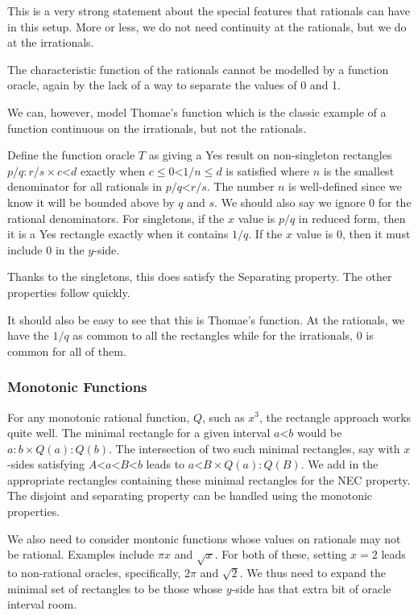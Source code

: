 \documentclass[12pt]{article}
\theoremstyle{remark}
\newcommand{\lt}{\mathord{<}}
\begin{document}
This is a very strong statement about the special features that rationals can have in this setup. More or less, we do not need continuity at the rationals, but we do at the irrationals. 

The characteristic function of the rationals cannot be modelled by a function oracle, again by the lack of a way to separate the values of 0 and 1. 

We can, however, model Thomae's function which is the classic example of a function continuous on the irrationals, but not the rationals. 

Define the function oracle $T$ as giving a Yes result on non-singleton rectangles $p/q : r/s \times c\lt d$ exactly when $c \leq 0 \lt 1/n \leq d$ is satisfied where $n$ is the smallest denominator for all rationals in $p/q \lt r/s$. The number $n$ is well-defined since we know it will be bounded above by $q$ and $s$.  We should also say we ignore $0$ for the rational denominators. For singletons, if the $x$ value is $p/q$ in reduced form, then it is a Yes rectangle exactly when it contains $1/q$. If the $x$ value is $0$, then it must include $0$ in the $y$-side.

Thanks to the singletons, this does satisfy the Separating property. The other properties follow quickly. 

It should also be easy to see that this is Thomae's function. At the rationals, we have the $1/q$ as common to all the rectangles while for the irrationals, $0$ is common for all of them. 

\subsubsection{Monotonic Functions}

For any monotonic rational function, $Q$, such as $x^3$, the rectangle approach works quite well. The minimal rectangle for a given interval $a \lt b$ would be $a:b \times Q(a):Q(b)$. The intersection of two such minimal rectangles, say with $x$-sides satisfying $A \lt a \lt B \lt b$ leads to $a \lt B  \times  Q(a):Q(B) $. We add in the appropriate rectangles containing these minimal rectangles for the NEC property. The disjoint and separating property can be handled using the monotonic properties. 

We also need to consider montonic functions whose values on rationals may not be rational. Examples include $\pi x$ and $\sqrt{x}$. For both of these, setting $x=2$ leads to non-rational oracles, specifically, $2 \pi$ and $\sqrt{2}$. We thus need to expand the minimal set of rectangles to be those whose $y$-side has that extra bit of oracle interval room. 
\end{document}
